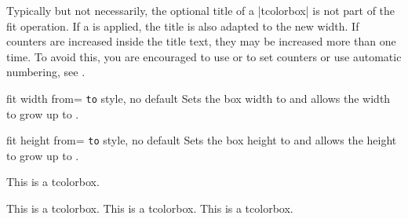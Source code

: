\begin{marker}
Typically but not necessarily, the optional title of a |tcolorbox| is not part of the fit operation.
If a  is applied, the title is also adapted to
the new width. If counters are increased inside the title text, they may be
increased more than one time.
To avoid this, you are encouraged to use  or 
to set counters or use automatic numbering, see .
\end{marker}


\begin{docTcbKey}{fit width from}{= \texttt{to} }{style, no default}
  Sets the box width to  and allows the width to grow up to .
\begin{dispExample}

\begin{tcolorbox}[fit,width=\linewidth/2]
\lipsum[2]
\end{tcolorbox}\par
\begin{tcolorbox}[fit width from=\linewidth/2 to \linewidth]
\lipsum[2]
\end{tcolorbox}\par
\end{dispExample}
\end{docTcbKey}

\clearpage
\begin{docTcbKey}{fit height from}{= \texttt{to} }{style, no default}
  Sets the box height to  and allows the height to grow up to .
\begin{dispExample}

\begin{mybox}
This is a tcolorbox.
\end{mybox}
\begin{mybox}
This is a tcolorbox. This is a tcolorbox. This is a tcolorbox.
\end{mybox}
\begin{mybox}
\lipsum[2]
\end{mybox}
\end{dispExample}
\end{docTcbKey}

